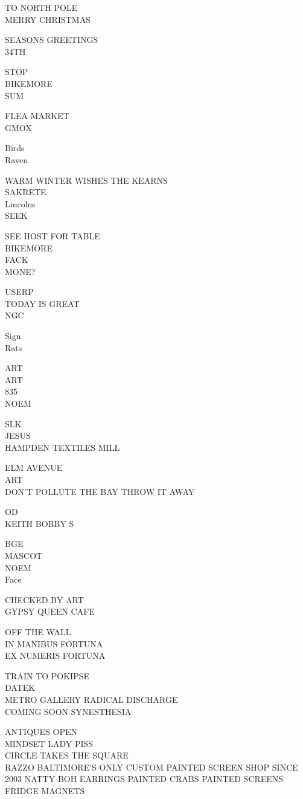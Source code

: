 \documentclass[10pt,letterpaper]{article}
\begin{document}
TO NORTH POLE\\
MERRY CHRISTMAS

SEASONS GREETINGS\\
34TH

STOP\\
BIKEMORE\\
SUM

FLEA MARKET\\
GMOX

Birds\\
Raven

WARM WINTER WISHES THE KEARNS\\
SAKRETE\\
Lincolns\\
SEEK

SEE HOST FOR TABLE\\
BIKEMORE\\
FACK\\
MONE?

USERP\\
TODAY IS GREAT\\
NGC

Sign\\
Rats

ART\\
ART\\
835\\
NOEM

SLK\\
JESUS\\
HAMPDEN TEXTILES MILL

ELM AVENUE\\
ART\\
DON'T POLLUTE THE BAY THROW IT AWAY

OD\\
KEITH BOBBY S

BGE\\
MASCOT\\
NOEM\\
Face

CHECKED BY ART\\
GYPSY QUEEN CAFE

OFF THE WALL\\
IN MANIBUS FORTUNA\\
EX NUMERIS FORTUNA

TRAIN TO POKIPSE\\
DATEK\\
METRO GALLERY RADICAL DISCHARGE\\
COMING SOON SYNESTHESIA

ANTIQUES OPEN\\
MINDSET LADY PISS\\
CIRCLE TAKES THE SQUARE\\
RAZZO BALTIMORE'S ONLY CUSTOM PAINTED SCREEN SHOP SINCE 2003 NATTY BOH EARRINGS PAINTED CRABS PAINTED SCREENS FRIDGE MAGNETS
\end{document}
